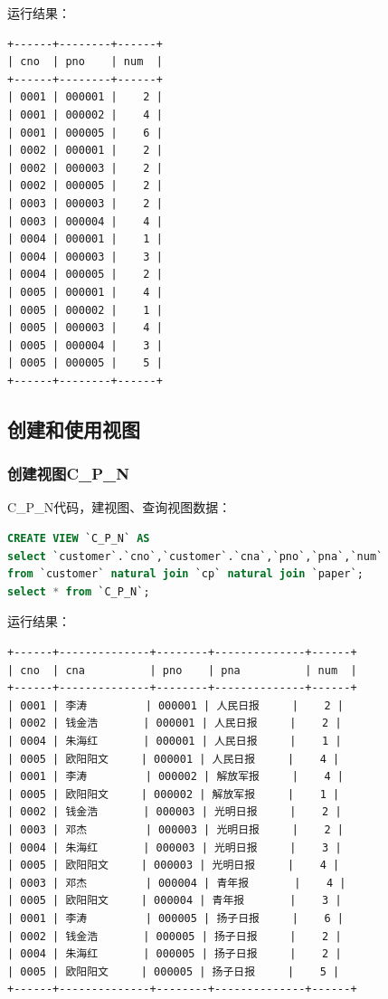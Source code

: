\documentclass[hyperref,UTF8,c5size]{ctexart}
\begin{document}
                    运行结果：
                    \begin{lstlisting}
+------+--------+------+
| cno  | pno    | num  |
+------+--------+------+
| 0001 | 000001 |    2 |
| 0001 | 000002 |    4 |
| 0001 | 000005 |    6 |
| 0002 | 000001 |    2 |
| 0002 | 000003 |    2 |
| 0002 | 000005 |    2 |
| 0003 | 000003 |    2 |
| 0003 | 000004 |    4 |
| 0004 | 000001 |    1 |
| 0004 | 000003 |    3 |
| 0004 | 000005 |    2 |
| 0005 | 000001 |    4 |
| 0005 | 000002 |    1 |
| 0005 | 000003 |    4 |
| 0005 | 000004 |    3 |
| 0005 | 000005 |    5 |
+------+--------+------+
                    \end{lstlisting}

    \subsection{创建和使用视图}
        \subsubsection{创建视图C\_P\_N}
            C\_P\_N代码，建视图、查询视图数据：
		    \begin{lstlisting}[language=SQL]
CREATE VIEW `C_P_N` AS 
select `customer`.`cno`,`customer`.`cna`,`pno`,`pna`,`num`
from `customer` natural join `cp` natural join `paper`;
select * from `C_P_N`;
		    \end{lstlisting}

            运行结果：
            \begin{lstlisting}
+------+--------------+--------+--------------+------+
| cno  | cna          | pno    | pna          | num  |
+------+--------------+--------+--------------+------+
| 0001 | 李涛         | 000001 | 人民日报     |    2 |
| 0002 | 钱金浩       | 000001 | 人民日报     |    2 |
| 0004 | 朱海红       | 000001 | 人民日报     |    1 |
| 0005 | 欧阳阳文     | 000001 | 人民日报     |    4 |
| 0001 | 李涛         | 000002 | 解放军报     |    4 |
| 0005 | 欧阳阳文     | 000002 | 解放军报     |    1 |
| 0002 | 钱金浩       | 000003 | 光明日报     |    2 |
| 0003 | 邓杰         | 000003 | 光明日报     |    2 |
| 0004 | 朱海红       | 000003 | 光明日报     |    3 |
| 0005 | 欧阳阳文     | 000003 | 光明日报     |    4 |
| 0003 | 邓杰         | 000004 | 青年报       |    4 |
| 0005 | 欧阳阳文     | 000004 | 青年报       |    3 |
| 0001 | 李涛         | 000005 | 扬子日报     |    6 |
| 0002 | 钱金浩       | 000005 | 扬子日报     |    2 |
| 0004 | 朱海红       | 000005 | 扬子日报     |    2 |
| 0005 | 欧阳阳文     | 000005 | 扬子日报     |    5 |
+------+--------------+--------+--------------+------+
            \end{lstlisting}
        
\end{document}

